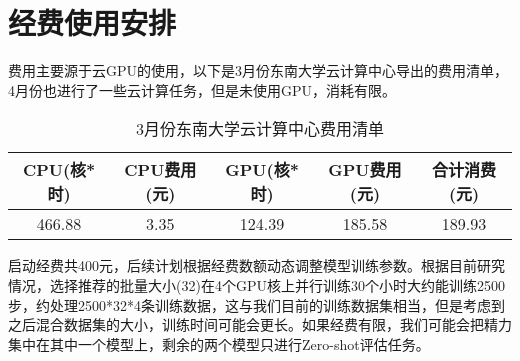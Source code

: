 \documentclass[12pt]{article}
\begin{document}
\section{经费使用安排}

费用主要源于云GPU的使用，以下是3月份东南大学云计算中心导出的费用清单，4月份也进行了一些云计算任务，但是未使用GPU，消耗有限。

\begin{table}[h]
      \centering
      \begin{tabular}{|c|c|c|c|c|}
            \hline
            CPU(核*时) & CPU费用(元) & GPU(核*时) & GPU费用(元) & 合计消费(元) \\
            \hline
            466.88   & 3.35     & 124.39   & 185.58   & 189.93  \\
            \hline
      \end{tabular}
      \caption{3月份东南大学云计算中心费用清单}
\end{table}

启动经费共400元，后续计划根据经费数额动态调整模型训练参数。根据目前研究情况，选择推荐的批量大小(32)在4个GPU核上并行训练30个小时大约能训练2500步，约处理2500*32*4条训练数据，这与我们目前的训练数据集相当，但是考虑到之后混合数据集的大小，训练时间可能会更长。如果经费有限，我们可能会把精力集中在其中一个模型上，剩余的两个模型只进行Zero-shot评估任务。
\newpage
\thispagestyle{empty}


\end{document}
